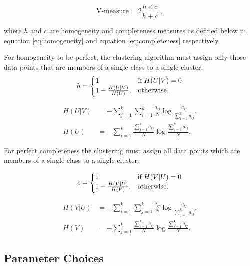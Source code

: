 \begin{equation}
  \label{eq:vmeasure}
  \text{V-measure} = 2 \frac{h \times c}{h + c} \;,
\end{equation}

\noindent where $h$ and $c$ are homogeneity and completeness measures as defined below in equation  \eqref{eq:homogeneity} and equation \eqref{eq:completeness} respectively. 

\newpage

For homogeneity to be perfect, the clustering algorithm must assign only those data points that are members of a single class to a single cluster.
\begin{equation}
\label{eq:homogeneity}
  h=\left\{
  \begin{array}{@{}ll@{}}
    1  & \text{if} \;  H(U|V) = 0 \\
    1 - \frac{H(U|V)}{H(U)}, & \text{otherwise.}
  \end{array}\right.
\end{equation}

\begin{align}
  \label{eq:H(U|V)}
H(U|V) &=  - \sum_{j=1}^{k} \sum_{i=1}^{k}\frac{a_{ij}}{N} \log \frac{a_{ij}}{\sum_{i=1}^{k}a_{ij}}.\\
H(U) &=  - \sum_{i=1}^{k} \frac{\sum_{j=1}^{k}a_{ij}}{N} \log \frac{\sum_{j=1}^{k}a_{ij}}{N}.
\end{align}

For perfect completeness the clustering must assign all data points which are members of a single class to a single cluster.

\begin{equation}
\label{eq:completeness}
 c=\left\{
  \begin{array}{@{}ll@{}}
    1  & \text{if} \;  H(V|U) = 0 \\
    1 - \frac{H(V|U)}{H(V)}, & \text{otherwise.}
  \end{array}\right.
\end{equation} 

\begin{align}
  \label{eq:H(V|U)}
H(V|U) &=  - \sum_{i=1}^{k} \sum_{j=1}^{k}\frac{a_{ij}}{N} \log \frac{a_{ij}}{\sum_{j=1}^{k}a_{ij}}.\\
H(V) &=  - \sum_{j=1}^{k} \frac{\sum_{i=1}^{k}a_{ij}}{N} \log \frac{\sum_{i=1}^{k}a_{ij}}{N}.
\end{align}

\newpage

\subsection{Parameter Choices}
\label{sec:parameter-choice}

